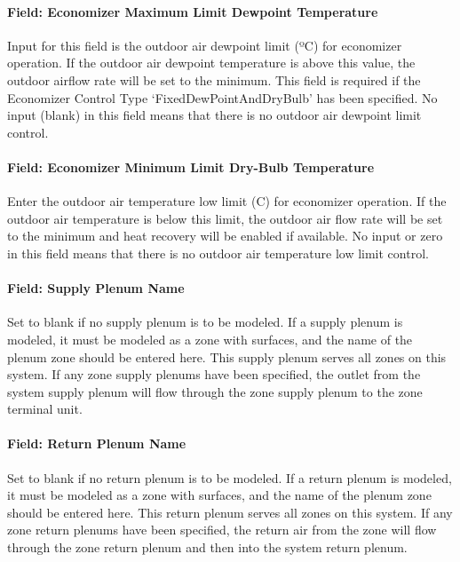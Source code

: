 \paragraph{Field: Economizer Maximum Limit Dewpoint Temperature}\label{field-economizer-maximum-limit-dewpoint-temperature-1}

Input for this field is the outdoor air dewpoint limit (ºC) for economizer operation. If the outdoor air dewpoint temperature is above this value, the outdoor airflow rate will be set to the minimum. This field is required if the Economizer Control Type `FixedDewPointAndDryBulb' has been specified. No input (blank) in this field means that there is no outdoor air dewpoint limit control.

\paragraph{Field: Economizer Minimum Limit Dry-Bulb Temperature}\label{field-economizer-minimum-limit-dry-bulb-temperature-000}

Enter the outdoor air temperature low limit (C) for economizer operation. If the outdoor air temperature is below this limit, the outdoor air flow rate will be set to the minimum and heat recovery will be enabled if available. No input or zero in this field means that there is no outdoor air temperature low limit control.

\paragraph{Field: Supply Plenum Name}\label{field-supply-plenum-name-6}

Set to blank if no supply plenum is to be modeled. If a supply plenum is modeled, it must be modeled as a zone with surfaces, and the name of the plenum zone should be entered here. This supply plenum serves all zones on this system. If any zone supply plenums have been specified, the outlet from the system supply plenum will flow through the zone supply plenum to the zone terminal unit.

\paragraph{Field: Return Plenum Name}\label{field-return-plenum-name-7}

Set to blank if no return plenum is to be modeled. If a return plenum is modeled, it must be modeled as a zone with surfaces, and the name of the plenum zone should be entered here. This return plenum serves all zones on this system. If any zone return plenums have been specified, the return air from the zone will flow through the zone return plenum and then into the system return plenum.

